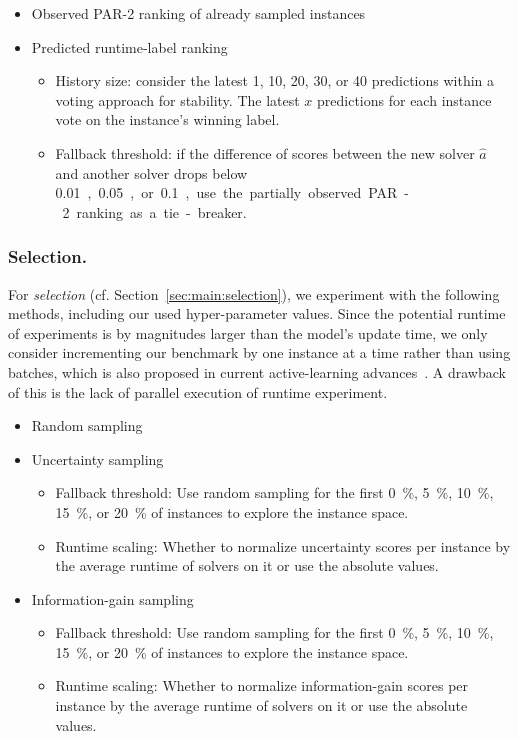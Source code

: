 \documentclass[runningheads]{llncs}
\begin{document}
\begin{itemize}
  \item Observed PAR-2 ranking of already sampled instances
  \item Predicted runtime-label ranking
  \begin{itemize}
    \item
    History size: consider the latest 1, 10, 20, 30, or 40 predictions within a voting approach for stability.
    The latest $x$ predictions for each instance vote on the instance's winning label.
    \item
    Fallback threshold: if the difference of scores between the new solver $\hat{a}$ and another solver drops below \SI{0.01}, \SI{0.05}, or \SI{0.1}, use the partially observed PAR-2 ranking as a tie-breaker.
  \end{itemize}
\end{itemize}

\subsubsection{Selection.}

For \emph{selection} (cf. Section~\ref{sec:main:selection}), we experiment with the following methods, including our used hyper-parameter values.
Since the potential runtime of experiments is by magnitudes larger than the model's update time, we only consider incrementing our benchmark by one instance at a time rather than using batches, which is also proposed in current active-learning advances~\cite{SinhaED19,2019gaal}.
A drawback of this is the lack of parallel execution of runtime experiment.

\begin{itemize}
  \item Random sampling 
  \item Uncertainty sampling
  \begin{itemize}
    \item Fallback threshold: Use random sampling for the first \SI{0}{\%}, \SI{5}{\%}, \SI{10}{\%}, \SI{15}{\%}, or \SI{20}{\%} of instances to explore the instance space.
    \item Runtime scaling: Whether to normalize uncertainty scores per instance by the average runtime of solvers on it or use the absolute values.
  \end{itemize}

  \item Information-gain sampling
  \begin{itemize}
    \item Fallback threshold: Use random sampling for the first \SI{0}{\%}, \SI{5}{\%}, \SI{10}{\%}, \SI{15}{\%}, or \SI{20}{\%} of instances to explore the instance space.
    \item Runtime scaling: Whether to normalize information-gain scores per instance by the average runtime of solvers on it or use the absolute values.
  \end{itemize}
\end{itemize}
\end{document}
